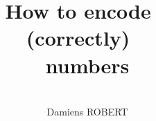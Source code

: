 \documentclass{article}
\title{How to encode
~\\
(correctly)
~\\
numbers
}
\date{
~\\
}
\author{
~\\
Damiens ROBERT
}
\begin{document}
  \maketitle
  \section{}
\end{document}
